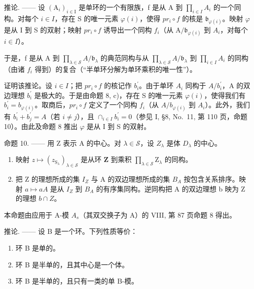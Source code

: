 推论. —— 设 \((\mathrm{A}_{i})_{i\in\mathrm{I}}\) 是单环的一个有限族，f 是从 A 到 \(\prod_{i\in I}A_{i}\) 的一个同构。对每个 \(i\in I\)，存在 S 的唯一元素 \(\varphi(i)\)，使得 \(pr_{i}\circ f\) 的核是 \(\mathfrak{b}_{\varphi(i)}\)。映射 \(\varphi\) 是从 I 到 S 的双射；映射 \(pr_{i}\circ f\) 诱导出一个同构 \(f_{i}\)（从 \(\mathrm{A}/\mathfrak{b}_{\varphi(i)}\) 到 \(A_{i}\)，对每个 \(i\in I\)）。

于是，f 是从 A 到 \(\prod_{\lambda\in\mathscr{S}}A/\mathfrak{b}_{\lambda}\) 的典范同构与从 \(\prod_{\lambda\in\mathscr{S}}A/\mathfrak{b}_{\lambda}\) 到 \(\prod_{i\in I}A_{i}\) 的同构（由诸 \(f_{i}\) 得到）的复合（“半单环分解为单环乘积的唯一性”）。

证明该推论。设 \(i \in I\)；把 \(pr_{i} \circ f\) 的核记作 \(b_{i}^{\prime}\)。由于单环 \(A_{i}\) 同构于 \(A/b_{i}^{\prime}\)，A 的双边理想 \(b_{i}^{\prime}\) 是极大的。于是由命题 8, c)，存在 S 的唯一元素 \(\varphi(i)\)，使得我们有 \(b_{i}^{\prime} = b_{\varphi(i)}\)。取商后，\(pr_{i} \circ f\) 定义了一个同构 \(f_{i}\)（从 \(A/b_{\varphi(i)}\) 到 \(A_{i}\)）。此外，我们有 \(b_{i}^{\prime} + b_{j}^{\prime} = A\)（若 \(i \neq j\)），且 \(\cap_{i \in I} b_{i}^{\prime} = 0\)（参见 I, §8, No.~11, 第 110 页，命题 10）。由此及命题 8 推出 \(\varphi\) 是从 I 到 S 的双射。

命题 10. —— 用 Z 表示 A 的中心。对 \(\lambda \in \mathcal{S}\)，设 \(Z_{\lambda}\) 是体 \(D_{\lambda}\) 的中心。

\begin{enumerate}
\def\labelenumi{\alph{enumi})}
\item
  映射 \(z \mapsto (z_{\mathrm{S}_{\lambda}})_{\lambda \in \mathcal{S}}\) 是从环 \(\mathbf{Z}\) 到乘积 \(\prod_{\lambda \in \mathcal{S}}\mathrm{Z}_{\lambda}\) 的同构。
\item
  把 Z 的理想所成的集 \(I_{Z}\) 与 A 的双边理想所成的集 \(B_{A}\) 按包含关系排序。映射 \(a \mapsto aA\) 是从 \(I_{Z}\) 到 \(B_{A}\) 的有序集同构。逆同构把 A 的双边理想 b 映为 Z 的理想 \(b \cap Z\)。
\end{enumerate}

本命题由应用于 A-模 \(A_{s}\)（其双交换子为 A）的 VIII, 第 87 页命题 8 得出。

推论. —— 设 B 是一个环。下列性质等价：

\begin{enumerate}
\def\labelenumi{(\roman{enumi})}
\item
  环 B 是单的。
\item
  环 B 是半单的，且其中心是一个体。
\item
  环 B 是半单的，且只有一类的单 B-模。
\end{enumerate}

